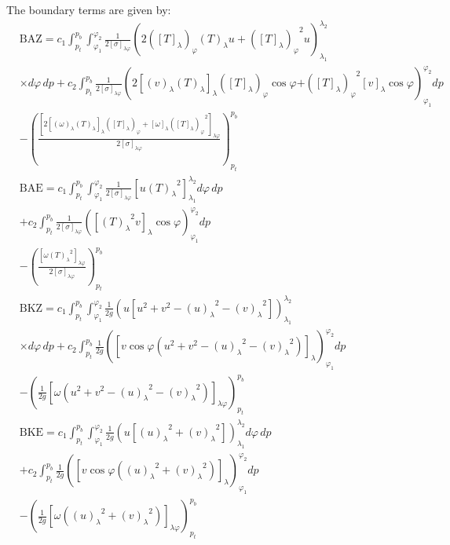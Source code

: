 \documentclass[pdflatex,sn-chicago]{sn-jnl}%
\theoremstyle{plain}
\theoremstyle{definition}
\theoremstyle{remark}
\theoremstyle{definition}
\begin{document}
The boundary terms are given by:
\begin{align}
& \mathrm{BAZ}=c_1 \int_{p_t}^{p_b} \int_{\varphi_1}^{\varphi_2} \frac{1}{2[\sigma]_{\lambda\varphi}}\left(2\left([T]_\lambda\right)_{\varphi}(T)_\lambda u+{\left([T]_\lambda\right)_{\varphi}}^2 u\right)_{\lambda_1}^{\lambda_2} \nonumber \\
& \times d\varphi\,dp+c_2 \int_{p_t}^{p_b} \frac{1}{2[\sigma]_{\lambda\varphi}}\left(2\left[(v)_\lambda(T)_\lambda\right]_\lambda\left([T]_\lambda\right)_{\varphi}\cos\varphi \right. \left.+{\left([T]_\lambda\right)_{\varphi}}^2[v]_\lambda\cos\varphi\right)_{\varphi_1}^{\varphi_2} dp \nonumber \\
& -\left(\frac{\left[2\left[(\omega)_\lambda(T)_\lambda\right]_\lambda\left([T]_\lambda\right)_{\varphi}+[\omega]_\lambda{\left([T]_\lambda\right)_{\varphi}}^2\right]_{\lambda\varphi}}{2[\sigma]_{\lambda\varphi}}\right)_{p_t}^{p_b} \\
& \mathrm{BAE}=c_1 \int_{p_t}^{p_b} \int_{\varphi_1}^{\varphi_2} \frac{1}{2[\sigma]_{\lambda\varphi}}\left[u{(T)_\lambda}^2\right]_{\lambda_1}^{\lambda_2} d\varphi\,dp \nonumber \\
& +c_2 \int_{p_t}^{p_b} \frac{1}{2[\sigma]_{\lambda\varphi}}\left(\left[{(T)_\lambda}^2v\right]_\lambda\cos\varphi\right)_{\varphi_1}^{\varphi_2} dp \nonumber \\
& -\left(\frac{\left[\omega{(T)_\lambda}^2\right]_{\lambda\varphi}}{2[\sigma]_{\lambda\varphi}}\right)_{p_t}^{p_b} \\
& \mathrm{BKZ}=c_1 \int_{p_t}^{p_b} \int_{\varphi_1}^{\varphi_2} \frac{1}{2g}\left(u\left[u^2+v^2-{(u)_\lambda}^2-{(v)_\lambda}^2\right]\right)_{\lambda_1}^{\lambda_2} \nonumber \\
& \times d\varphi\,dp+c_2 \int_{p_t}^{p_b} \frac{1}{2g}\left(\left[v\cos\varphi\left(u^2+v^2-{(u)_\lambda}^2-{(v)_\lambda}^2\right)\right]_\lambda\right)_{\varphi_1}^{\varphi_2} dp \nonumber \\
& -\left(\frac{1}{2g}\left[\omega\left(u^2+v^2-{(u)_\lambda}^2-{(v)_\lambda}^2\right)\right]_{\lambda\varphi}\right)_{p_t}^{p_b} \\
& \mathrm{BKE}=c_1 \int_{p_t}^{p_b} \int_{\varphi_1}^{\varphi_2} \frac{1}{2g}\left(u\left[{(u)_\lambda}^2+{(v)_\lambda}^2\right]\right)_{\lambda_1}^{\lambda_2} d\varphi\,dp \nonumber \\
& +c_2 \int_{p_t}^{p_b} \frac{1}{2g}\left(\left[v\cos\varphi\left({(u)_\lambda}^2+{(v)_\lambda}^2\right)\right]_\lambda\right)_{\varphi_1}^{\varphi_2} dp \nonumber \\
& -\left(\frac{1}{2g}\left[\omega\left({(u)_\lambda}^2+{(v)_\lambda}^2\right)\right]_{\lambda\varphi}\right)_{p_t}^{p_b}
\end{align}
\end{document}
